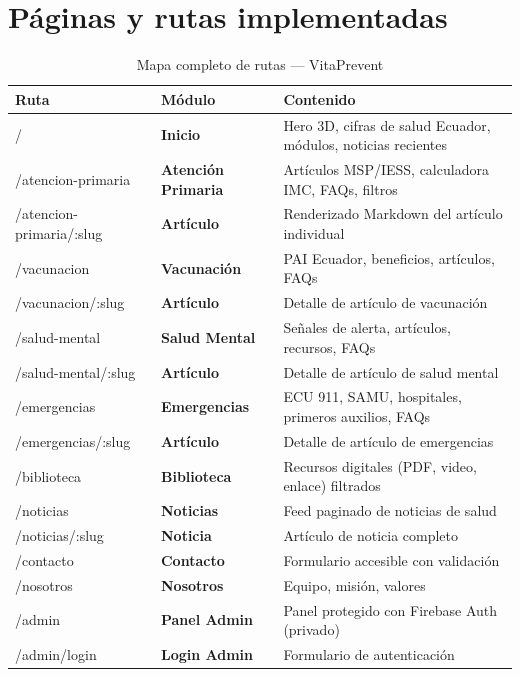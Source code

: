 \documentclass[12pt, a4paper]{article}
\begin{document}
\section{Páginas y rutas implementadas}

\begin{table}[H]
\centering
\caption{Mapa completo de rutas --- VitaPrevent}
\begin{tabular}{@{}>{\ttfamily\small}p{4.5cm} >{\bfseries}p{3cm} p{5.5cm}@{}}
\toprule
\rowcolor{royalblue!12}
\textbf{Ruta} & \textbf{Módulo} & \textbf{Contenido} \\
\midrule
/ & Inicio & Hero 3D, cifras de salud Ecuador, módulos, noticias recientes \\
/atencion-primaria & Atención Primaria & Artículos MSP/IESS, calculadora IMC, FAQs, filtros \\
/atencion-primaria/:slug & Artículo & Renderizado Markdown del artículo individual \\
/vacunacion & Vacunación & PAI Ecuador, beneficios, artículos, FAQs \\
/vacunacion/:slug & Artículo & Detalle de artículo de vacunación \\
/salud-mental & Salud Mental & Señales de alerta, artículos, recursos, FAQs \\
/salud-mental/:slug & Artículo & Detalle de artículo de salud mental \\
/emergencias & Emergencias & ECU 911, SAMU, hospitales, primeros auxilios, FAQs \\
/emergencias/:slug & Artículo & Detalle de artículo de emergencias \\
/biblioteca & Biblioteca & Recursos digitales (PDF, video, enlace) filtrados \\
/noticias & Noticias & Feed paginado de noticias de salud \\
/noticias/:slug & Noticia & Artículo de noticia completo \\
/contacto & Contacto & Formulario accesible con validación \\
/nosotros & Nosotros & Equipo, misión, valores \\
/admin & Panel Admin & Panel protegido con Firebase Auth (privado) \\
/admin/login & Login Admin & Formulario de autenticación \\
\bottomrule
\end{tabular}
\end{table}
\end{document}
